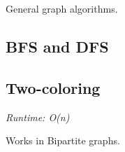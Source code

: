 
General graph algorithms.

\subsection*{BFS and DFS}

\subsection*{Two-coloring}

\textit{Runtime: O(n)}

Works in Bipartite graphs.




\newpage